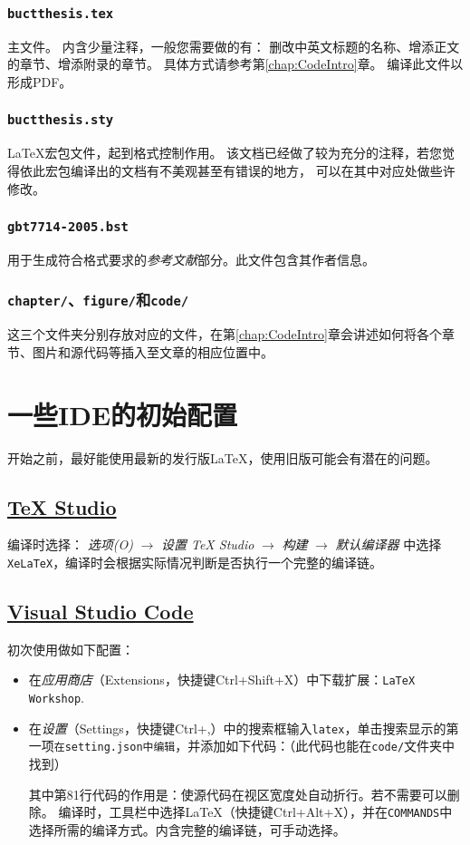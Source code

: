 		\subsubsection{\texttt{buctthesis.tex}}主文件。
		内含少量注释，一般您需要做的有：
		删改中英文标题的名称、增添正文的章节、增添附录的章节。
		具体方式请参考第\ref{chap:CodeIntro}章。
		编译此文件以形成PDF。
		\subsubsection{\texttt{buctthesis.sty}}
		\LaTeX{}宏包文件，起到格式控制作用。
		该文档已经做了较为充分的注释，若您觉得依此宏包编译出的文档有不美观甚至有错误的地方，
		可以在其中对应处做些许修改。
		\subsubsection{\texttt{gbt7714-2005.bst}}
		用于生成符合格式要求的\emph{参考文献}部分。此文件包含其作者信息。
		\subsubsection{\texttt{chapter/}、\texttt{figure/}和\texttt{code/}}
		这三个文件夹分别存放对应的文件，在第\ref{chap:CodeIntro}章会讲述如何将各个章节、图片和源代码等插入至文章的相应位置中。
		

	\section{一些IDE的初始配置}
		开始之前，最好能使用最新的发行版\LaTeX{}，使用旧版可能会有潜在的问题。
		\subsection{\href{http://texstudio.sourceforge.net}{\TeX{} Studio}}
			编译时选择\XeLaTeX{}：
			\emph{选项(O)} $\rightarrow$ \emph{设置 TeX Studio} $\rightarrow$ \emph{构建} $\rightarrow$ \emph{默认编译器} 中选择\texttt{XeLaTeX}，编译时会根据实际情况判断是否执行一个完整的编译链。

		\subsection{\href{https://code.visualstudio.com}{Visual Studio Code}}
		初次使用做如下配置：
		\begin{itemize}
			\item 在\emph{应用商店}（Extensions，快捷键Ctrl+Shift+X）中下载扩展：\texttt{LaTeX Workshop}.
			\item 在\emph{设置}（Settings，快捷键Ctrl+,）中的搜索框输入\texttt{latex}，单击搜索显示的第一项\texttt{在setting.json中编辑}，并添加如下代码：（此代码也能在\texttt{code/}文件夹中找到）
			
			其中第81行代码的作用是：使源代码在视区宽度处自动折行。若不需要可以删除。
			编译时，工具栏中选择LaTeX（快捷键Ctrl+Alt+X），并在\texttt{COMMANDS}中选择所需的编译方式。内含完整的编译链，可手动选择。
	
		\end{itemize}
		